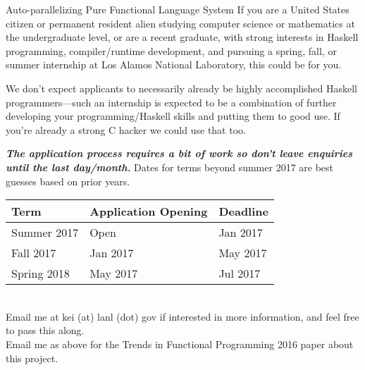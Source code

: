 \begin{hcarentry}[new]{Auto-parallelizing Pure Functional Language System}
If you are a United States citizen or permanent resident alien studying
computer science or mathematics at the undergraduate level, or are a recent
graduate, with strong interests in Haskell programming, compiler/runtime
development, and pursuing a spring, fall, or summer internship at Los Alamos
National Laboratory, this could be for you.

We don't expect applicants to necessarily already be highly accomplished
Haskell programmers---such an internship is expected to be a combination of
further developing your programming/Haskell skills and putting them to good
use.  If you're already a strong C hacker we could use that too.

\emph{\bfseries The application process requires a bit of work so don't leave
enquiries until the last day/month.}  Dates for terms beyond summer 2017 are
best guesses based on prior years.\\

\begin{tabular}{l||l|l}
Term & Application Opening & Deadline \\
\hline
Summer 2017  & Open & Jan 2017 \\
Fall 2017    & Jan 2017 & May 2017 \\
Spring 2018  & May 2017 & Jul 2017 \\
\end{tabular}\\

\noindent Email me at kei (at) lanl (dot) gov if interested in more
information, and feel free to pass this along. \\

\FurtherReading
Email me as above for the Trends in Functional Programming 2016 paper
about this project.

\end{hcarentry}
